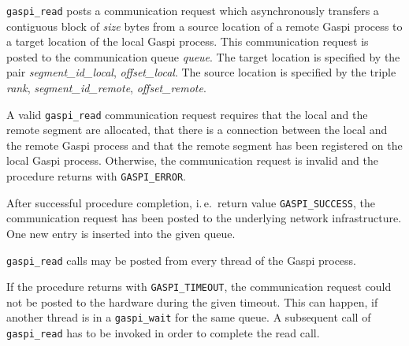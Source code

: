 \documentclass[a4paper]{article}
\makeatletter
\newlength{\st}\setlength{\st}{0pt}
\newcommand{\zsep}[1]{#1}
\newcommand{\gaspiprefix}{gaspi}
\newcommand{\GASPI}{{\sc Gaspi}}
\newcommand{\function}[1]{{\tt #1}}
\newcommand{\parameter}[1]{{\it #1}}
\newcommand{\gaspifunction}[1]{\function{\protect\zsep{\gaspiprefix\_#1}}}
\newcounter{counttodo}
\newlength{\savetabcolsep}
\newlength{\savearrayrulewidth}
\newenvironment{todo}
{\stepcounter{counttodo}
 \typeout{Environment TODO call \thecounttodo}
 \setlength{\savetabcolsep}{\tabcolsep}
 \setlength{\savearrayrulewidth}{\arrayrulewidth}
 \renewcommand{\tabcolsep}{0pt}
 \renewcommand{\arrayrulewidth}{2pt}
 \begin{center}
 \begin{tabular}{c|l@{\hspace*{2em}}|@{\hspace*{2em}}c}
 &
 \begin{minipage}{0.66\textwidth}
 \begin{itemize}
}
{\end{itemize}
 \end{minipage}
 &  todo \#\thecounttodo
 \end{tabular} \marginpar{$\Longleftarrow$}
 \end{center}
 \renewcommand{\tabcolsep}{\savetabcolsep}
 \renewcommand{\arrayrulewidth}{\savearrayrulewidth}
}
\newcommand{\GASPISUCC}{{\tt\protect\zsep{GASPI\_SUCCESS}}}
\newcommand{\GASPITIME}{{\tt\protect\zsep{GASPI\_TIMEOUT}}}
\newcommand{\GASPIGERR}{{\tt\protect\zsep{GASPI\_ERROR}}}
\makeatother
\begin{document}
\gaspifunction{read} posts a communication request which asynchronously transfers a contiguous block
of \parameter{size} bytes from a source location of a remote \GASPI{} process to a target location of the
local \GASPI{} process. This communication request is posted to the communication queue \parameter{queue}.
The target location is specified by the pair \parameter{segment\_id\_local}, \parameter{offset\_local}. The
source location is specified by the triple \parameter{rank}, \parameter{segment\_id\_remote},
\parameter{offset\_remote}.


A valid \gaspifunction{read} communication request requires that the local and the
remote segment are allocated, that there is a connection between the local
and the remote \GASPI{} process and that the remote segment has been registered
on the local \GASPI{} process. Otherwise, the communication request is invalid
and the procedure returns with \GASPIGERR{}.

After successful procedure completion, i.\,e.\ return value \GASPISUCC{}, the communication request has
been posted to the underlying network infrastructure. One new entry is
inserted into the given queue.

%


\gaspifunction{read} calls may be posted from every thread of the \GASPI{} process.

If the procedure returns with \GASPITIME{}, the communication request could not be posted
to the hardware during the given timeout. This can happen, if another thread is in a \gaspifunction{wait}
for the same queue. A subsequent call of \gaspifunction{read} has to be
invoked in order to complete the read call.
\end{document}
